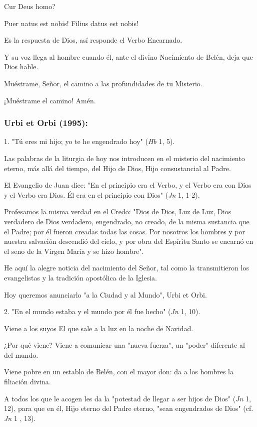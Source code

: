 \begin{body}
\begin{body}
Cur Deus homo?

Puer natus est nobis! Filius datus est nobis!

Es la respuesta de Dios, así responde el Verbo Encarnado.

Y su voz llega al hombre cuando él, ante el divino Nacimiento de Belén, deja que Dios hable.

Muéstrame, Señor, el camino a las profundidades de tu Misterio.

¡Muéstrame el camino! Amén.
\end{body} 
	
\subsubsection{Urbi et Orbi (1995): }

\begin{body} 
1. "Tú eres mi hijo; yo te he engendrado hoy" (\emph{Hb} 1, 5).

Las palabras de la liturgia de hoy nos introducen en el misterio del nacimiento eterno, más allá del tiempo, del Hijo de Dios, Hijo consustancial al Padre.

El Evangelio de Juan dice: "En el principio era el Verbo, y el Verbo era con Dios y el Verbo era Dios. Él era en el principio con Dios" (\emph{Jn} 1, 1-2).

Profesamos la misma verdad en el Credo: "Dios de Dios, Luz de Luz, Dios verdadero de Dios verdadero, engendrado, no creado, de la misma sustancia que el Padre; por él fueron creadas todas las cosas. Por nosotros los hombres y por nuestra salvación descendió del cielo, y por obra del Espíritu Santo se encarnó en el seno de la Virgen María y se hizo hombre".

He aquí la alegre noticia del nacimiento del Señor, tal como la transmitieron los evangelistas y la tradición apostólica de la Iglesia.

Hoy queremos anunciarlo "a la Ciudad y al Mundo", Urbi et Orbi.

2. "En el mundo estaba y el mundo por él fue hecho" (\emph{Jn} 1, 10).

Viene a los suyos El que sale a la luz en la noche de Navidad.

¿Por qué viene? Viene a comunicar una "nueva fuerza", un "poder" diferente al del mundo.

Viene pobre en un establo de Belén, con el mayor don: da a los hombres la filiación divina.

A todos los que le acogen les da la "potestad de llegar a ser hijos de Dios" (\emph{Jn} 1, 12), para que en él, Hijo eterno del Padre eterno, "sean engendrados de Dios" (cf. \emph{Jn} 1 , 13).


\end{body}
\end{body}
